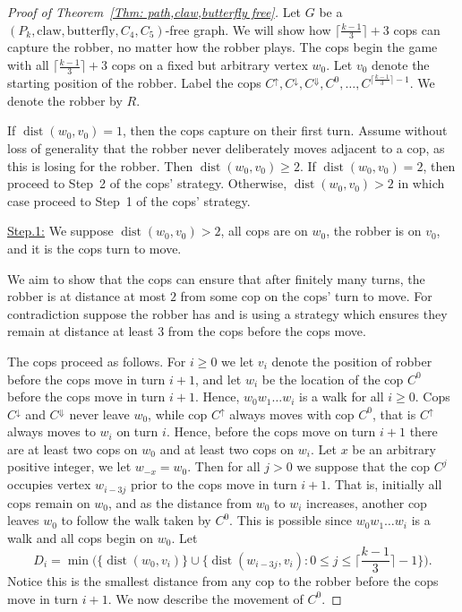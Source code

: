 \documentclass[12pt]{article}
\theoremstyle{definition}
\def\claw{\text{claw}}
\def\butterfly{\text{butterfly}}
\DeclareMathOperator{\dist}{dist}
\begin{document}
\begin{proof}[Proof of Theorem~\ref{Thm: path,claw,butterfly free}]

Let $G$ be a $(P_k,\claw,\butterfly,C_4,C_5)$-free graph.
We will show how  $\lceil\frac{k-1}{3}\rceil+3$ cops can capture the robber, no matter how the robber plays.
The cops begin the game with all $\lceil\frac{k-1}{3}\rceil+3$ cops on a fixed but arbitrary vertex $w_0$.
Let $v_0$ denote the starting position of the robber.
Label the cops $C^\uparrow,C^\downarrow, C^\Downarrow, C^0,\dots, C^{\lceil\frac{k-1}{3}\rceil-1}$.
We denote the robber by $R$.

If $\dist(w_0,v_0) = 1$, then the cops capture on their first turn.
Assume without loss of generality that the robber never deliberately moves adjacent to a cop, as this is losing for the robber.
Then $\dist(w_0,v_0)\geq 2$.
If $\dist(w_0,v_0) = 2$, then proceed to Step~2 of the cops' strategy.
Otherwise, $\dist(w_0,v_0) > 2$ in which case proceed to Step~1 of the cops' strategy.


\vspace{0.25cm}
\noindent\underline{Step.1:}  We suppose $\dist(w_0,v_0) > 2$, all cops are on $w_0$, the robber is on $v_0$, and it is the cops turn to move.
\vspace{0.25cm}

We aim to show that the cops can ensure that after finitely many turns, the robber is at distance at most $2$ from some cop on the cops' turn to move.
For contradiction suppose the robber has and is using a strategy which ensures they remain at distance at least $3$ from the cops before the cops move. 


The cops proceed as follows.
For $i\geq 0$ we let $v_i$ denote the position of robber before the cops move in turn $i+1$, 
and let $w_i$ be the location of the cop $C^0$ before the cops move in turn $i+1$.
Hence, $w_0w_1\dots w_i$ is a walk for all $i\geq 0$.
Cops $C^\downarrow$ and $C^{\Downarrow}$ never leave $w_0$, 
while cop $C^\uparrow$ always moves with cop $C^0$, that is $C^\uparrow$ always moves to $w_i$ on turn $i$. 
Hence, before the cops move on turn $i+1$ there are at least two cops on $w_0$ and at least two cops on $w_i$.
Let $x$ be an arbitrary positive integer, we let $w_{-x} = w_0$.
Then for all $j>0$ we suppose that the cop $C^j$ occupies vertex
$w_{i-3j}$ prior to the cops move in turn $i+1$. 
That is, initially all cops remain on $w_0$,
and as the distance from $w_0$ to $w_i$ increases, another cop leaves $w_0$ to follow the walk taken by $C^0$.
This is possible since $w_0w_1\dots w_i$ is a walk and all cops begin on $w_0$.
Let 
\[
D_i = \min\Big(\Big\{\dist(w_0,v_i)\Big\} \cup  \Big\{\dist(w_{i-3j},v_i): 0 \leq j \leq \Big\lceil\frac{k-1}{3} \Big\rceil-1\Big\} \Big).
\]
Notice this is the smallest distance from any cop to the robber before the cops move in turn $i+1$.
We now describe the movement of $C^0$.



\end{proof}
\end{document}
